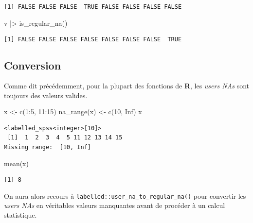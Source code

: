 \documentclass[
  letterpaper,
  DIV=11,
  numbers=noendperiod,
  oneside]{scrreprt}
\newenvironment{Shaded}{\begin{snugshade}}{\end{snugshade}}
\newcommand{\ConstantTok}[1]{\textcolor[rgb]{0.56,0.35,0.01}{#1}}
\newcommand{\DecValTok}[1]{\textcolor[rgb]{0.68,0.00,0.00}{#1}}
\newcommand{\FunctionTok}[1]{\textcolor[rgb]{0.28,0.35,0.67}{#1}}
\newcommand{\NormalTok}[1]{\textcolor[rgb]{0.00,0.23,0.31}{#1}}
\newcommand{\OtherTok}[1]{\textcolor[rgb]{0.00,0.23,0.31}{#1}}
\newcommand{\SpecialCharTok}[1]{\textcolor[rgb]{0.37,0.37,0.37}{#1}}
\begin{document}
\begin{verbatim}
[1] FALSE FALSE FALSE  TRUE FALSE FALSE FALSE FALSE
\end{verbatim}

\begin{Shaded}
\begin{Highlighting}[]
\NormalTok{v }\SpecialCharTok{|\textgreater{}} \FunctionTok{is\_regular\_na}\NormalTok{()}
\end{Highlighting}
\end{Shaded}

\begin{verbatim}
[1] FALSE FALSE FALSE FALSE FALSE FALSE FALSE  TRUE
\end{verbatim}

\hypertarget{conversion-1}{%
\subsection{Conversion}\label{conversion-1}}

Comme dit précédemment, pour la plupart des fonctions de \textbf{R}, les
\emph{users NAs} sont toujours des valeurs valides.

\begin{Shaded}
\begin{Highlighting}[]
\NormalTok{x }\OtherTok{\textless{}{-}} \FunctionTok{c}\NormalTok{(}\DecValTok{1}\SpecialCharTok{:}\DecValTok{5}\NormalTok{, }\DecValTok{11}\SpecialCharTok{:}\DecValTok{15}\NormalTok{)}
\FunctionTok{na\_range}\NormalTok{(x) }\OtherTok{\textless{}{-}} \FunctionTok{c}\NormalTok{(}\DecValTok{10}\NormalTok{, }\ConstantTok{Inf}\NormalTok{)}
\NormalTok{x}
\end{Highlighting}
\end{Shaded}

\begin{verbatim}
<labelled_spss<integer>[10]>
 [1]  1  2  3  4  5 11 12 13 14 15
Missing range:  [10, Inf]
\end{verbatim}

\begin{Shaded}
\begin{Highlighting}[]
\FunctionTok{mean}\NormalTok{(x)}
\end{Highlighting}
\end{Shaded}

\begin{verbatim}
[1] 8
\end{verbatim}

On aura alors recours à \texttt{labelled::user\_na\_to\_regular\_na()}
pour convertir les \emph{users NAs} en véritables valeurs manquantes
avant de procéder à un calcul statistique.
\end{document}
